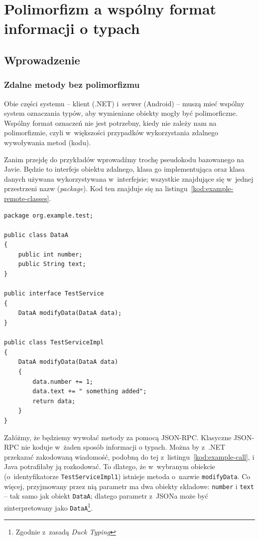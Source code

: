 \section{Polimorfizm a wspólny format informacji o typach}

\subsection{Wprowadzenie}

\subsubsection{Zdalne metody bez polimorfizmu}
Obie części systemu -- klient (.NET) i~serwer (Android) -- muszą mieć wspólny system oznaczania typów, aby wymieniane obiekty mogły być polimorficzne. 
Wspólny format oznaczeń nie jest potrzebny, kiedy nie zależy nam na polimorfizmie, czyli w~większości przypadków wykorzystania zdalnego wywoływania metod (kodu).

Zanim przejdę do przykładów wprowadźmy trochę pseudokodu bazowanego na Javie. Będzie to interfejs obiektu zdalnego, klasa go implementująca oraz klasa danych używana wykorzystywana w~interfejsie; wszystkie znajdujące się w~jednej przestrzeni nazw (\emph{package}). Kod ten znajduje się na listingu~\ref{kod:example-remote-classes}.

\begin{lstlisting}[float, frame=single, caption={Przykładowy kod metody zdalnej.}, label=kod:example-remote-classes]
package org.example.test;

public class DataA
{
    public int number;
    public String text;
}

public interface TestService
{        
    DataA modifyData(DataA data);
}

public class TestServiceImpl
{
    DataA modifyData(DataA data)
    {
        data.number += 1;
        data.text += " something added";
        return data;
    }
}
\end{lstlisting}

Załóżmy, że będziemy wywołać metody za pomocą JSON-RPC. Klasyczne JSON-RPC nie koduje w~żaden sposób informacji o typach. Można by z~.NET przekazać zakodowaną wiadomość, podobną do tej z~listingu~\ref{kod:example-call}, i Java potrafiłaby ją rozkodować. To dlatego, że w~wybranym obiekcie (o~identyfikatorze \texttt{TestServiceImpl1}) istnieje metoda o~nazwie \texttt{modifyData}. Co więcej, przyjmowany przez nią parametr ma dwa obiekty składowe: \texttt{number} i \texttt{text} -- tak samo jak obiekt \texttt{DataA}; dlatego parametr z~JSONa może być zinterpretowany jako \texttt{DataA}\footnote{Zgodnie z~zasadą \emph{Duck Typing}}.

